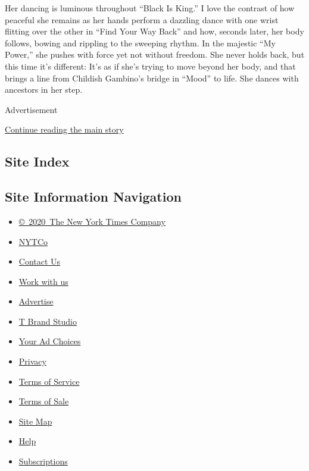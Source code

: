 Her dancing is luminous throughout ``Black Is King.'' I love the
contrast of how peaceful she remains as her hands perform a dazzling
dance with one wrist flitting over the other in ``Find Your Way Back''
and how, seconds later, her body follows, bowing and rippling to the
sweeping rhythm. In the majestic ``My Power,'' she pushes with force yet
not without freedom. She never holds back, but this time it's different:
It's as if she's trying to move beyond her body, and that brings a line
from Childish Gambino's bridge in ``Mood'' to life. She dances with
ancestors in her step.

Advertisement

\protect\hyperlink{after-bottom}{Continue reading the main story}

\hypertarget{site-index}{%
\subsection{Site Index}\label{site-index}}

\hypertarget{site-information-navigation}{%
\subsection{Site Information
Navigation}\label{site-information-navigation}}

\begin{itemize}
\tightlist
\item
  \href{https://help.nytimes3xbfgragh.onion/hc/en-us/articles/115014792127-Copyright-notice}{©~2020~The
  New York Times Company}
\end{itemize}

\begin{itemize}
\tightlist
\item
  \href{https://www.nytco.com/}{NYTCo}
\item
  \href{https://help.nytimes3xbfgragh.onion/hc/en-us/articles/115015385887-Contact-Us}{Contact
  Us}
\item
  \href{https://www.nytco.com/careers/}{Work with us}
\item
  \href{https://nytmediakit.com/}{Advertise}
\item
  \href{http://www.tbrandstudio.com/}{T Brand Studio}
\item
  \href{https://www.nytimes3xbfgragh.onion/privacy/cookie-policy\#how-do-i-manage-trackers}{Your
  Ad Choices}
\item
  \href{https://www.nytimes3xbfgragh.onion/privacy}{Privacy}
\item
  \href{https://help.nytimes3xbfgragh.onion/hc/en-us/articles/115014893428-Terms-of-service}{Terms
  of Service}
\item
  \href{https://help.nytimes3xbfgragh.onion/hc/en-us/articles/115014893968-Terms-of-sale}{Terms
  of Sale}
\item
  \href{https://spiderbites.nytimes3xbfgragh.onion}{Site Map}
\item
  \href{https://help.nytimes3xbfgragh.onion/hc/en-us}{Help}
\item
  \href{https://www.nytimes3xbfgragh.onion/subscription?campaignId=37WXW}{Subscriptions}
\end{itemize}
